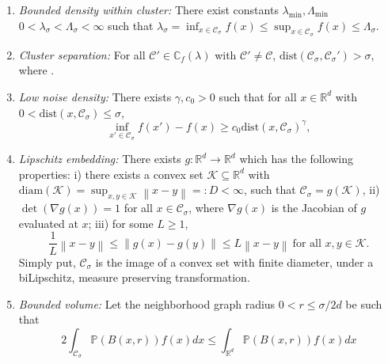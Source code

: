 \documentclass{article}
\newcommand{\diam}{\mathrm{diam}}
\newcommand{\Reals}{\mathbb{R}}
\newcommand{\Rd}{\Reals^d}
\newcommand{\norm}[1]{\left\lVert#1\right\rVert}
\newcommand{\1}{\mathbf{1}}
\newcommand{\dist}{\mathrm{dist}}
\newcommand{\Pbb}{\mathbb{P}}
\newcommand{\Cbb}{\mathbb{C}}
\newcommand{\Cset}{\mathcal{C}}
\newcommand{\Csig}{\Cset_{\sigma}}
\theoremstyle{aldenthm}
\theoremstyle{aldenrmrk}
\begin{document}
\begin{enumerate}[label=(A\arabic*)]
	\item
	\label{asmp: bounded_density}
	\emph{Bounded density within cluster:} There exist constants $\lambda_{\min}, \Lambda_{\min}$ $0 < \lambda_{\sigma} <
	\Lambda_{\sigma} < \infty$ such that $ \lambda_{\sigma} = \inf_{x \in \Csig} f(x) \leq \sup_{x \in \Csig} f(x) \leq \Lambda_{\sigma}.$
	
	\item
	\label{asmp: cluster_separation}
	\emph{Cluster separation:}
	For all $\Cset' \in \Cbb_f(\lambda)$ with $\Cset' \not= \Cset$, $\dist(\Csig,\Csig') > \sigma$,
	where \smash{$\dist(\Csig,\Csig') := \inf_{x \in \Csig} \dist(x,\Csig')$}. 
	
	\item 
	\label{asmp: low_noise_density}
	\emph{Low noise density:} There exists $\gamma,c_0 > 0$ such that for all $x
	\in \Rd$ with $0 < \dist(x, \Csig) \leq \sigma$,   
	$$
	\inf_{x' \in \Csig} f(x') - f(x) \geq  c_0 \dist(x, \Csig)^{\gamma},
	$$ 
	
	\item
	\label{asmp: embedding}
	\emph{Lipschitz embedding:}
	There exists $g: \Reals^d \to \Reals^d$ which has the following properties: i) there exists a convex set $\mathcal{K} \subseteq \Rd$ with $\diam(\mathcal{K}) = \sup_{x,y \in \mathcal{K}}\norm{x - y} =: D < \infty$, such that $\Csig = g(\mathcal{K})$, ii) $\det(\nabla g (x)) = 1$ for all $x \in \Csig$, where $\nabla g(x)$ is the Jacobian of $g$ evaluated at $x$; iii) for some $L \geq 1$, 
	\begin{equation*}
	\frac{1}{L}\norm{x - y} \leq \norm{g(x) - g(y)} \leq L \norm{x - y} ~ \text{for all $x,y \in \mathcal{K}$}.
	\end{equation*}
	Simply put, $\Csig$ is the image of a convex set with finite diameter, under a biLipschitz, measure preserving transformation.
	\item
	\label{asmp: bounded_volume}
	\emph{Bounded volume:}
	Let the neighborhood graph radius $0 < r \leq \sigma/2d$ be such that
	\begin{equation}
	\label{eqn: weighted_cluster_volume}
	2 \int_{\Csig} \Pbb(B(x,r)) f(x) dx \leq \int_{\Rd} \Pbb(B(x,r)) f(x) dx
	\end{equation}
\end{enumerate}
\end{document}
